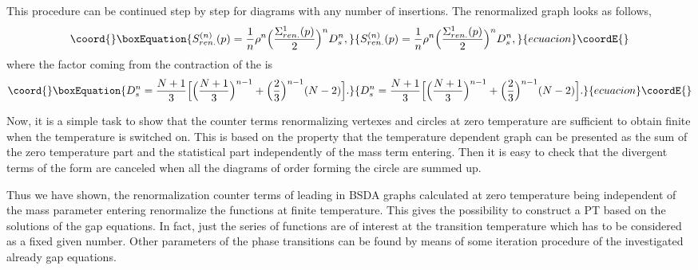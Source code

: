 \documentclass[a4paper,12pt]{article}
\begin{document}
This procedure can be continued step by step for diagrams with any
number of \coordHE{} insertions. The renormalized graph \coordHE{}
looks as follows,
\begin{equation}\coord{}\boxEquation{ \label{snr}
S^{(n)}_{ren.}(p) = \frac{1}{n}\rho^n
\Bigl(\frac{\Sigma^1_{ren.}(p)}{2}\Bigr)^n D_s^n,
}{ S^{(n)}_{ren.}(p) = \frac{1}{n}\rho^n
\Bigl(\frac{\Sigma^1_{ren.}(p)}{2}\Bigr)^n D_s^n,
}{ecuacion}\coordE{}\end{equation}
where the factor coming from the contraction of the
\coordHE{} is
\begin{equation}\coord{}\boxEquation{ \label{dn}
D^{n}_{s} = \frac{N+1}{3}\Bigl[ \Bigl(\frac{N+1}{3}\Bigr)^{n-1} +
\Bigl(\frac{2}{3}\Bigr)^{n-1} (N -2)\Bigr].
}{ D^{n}_{s} = \frac{N+1}{3}\Bigl[ \Bigl(\frac{N+1}{3}\Bigr)^{n-1} +
\Bigl(\frac{2}{3}\Bigr)^{n-1} (N -2)\Bigr].
}{ecuacion}\coordE{}\end{equation}

Now, it is a simple task to show that the counter terms renormalizing
vertexes \coordHE{} and circles \coordHE{} at zero temperature are
sufficient to obtain finite \coordHE{} when the temperature is
switched on. This is based on the property that the temperature
dependent graph \coordHE{} can be presented as the sum of the
zero temperature part and the statistical part independently of the
mass term entering.  Then it is easy to check that the divergent terms
of the form \coordHE{} are canceled when all the diagrams of order \coordHE{}
forming the circle \coordHE{} are summed up.

Thus we have shown, the renormalization counter terms of leading in
\coordHE{} BSDA graphs calculated at zero temperature being independent of
the mass parameter entering \coordHE{} renormalize the \coordHE{}
functions at finite temperature. This gives the possibility to
construct a PT based on the solutions of the gap equations.  In fact,
just the series of \coordHE{} functions are of interest at the
transition temperature \coordHE{} which has to be considered as a fixed
given number. Other parameters of the phase transitions can be found
by means of some iteration procedure of the investigated already gap
equations.
\end{document}
